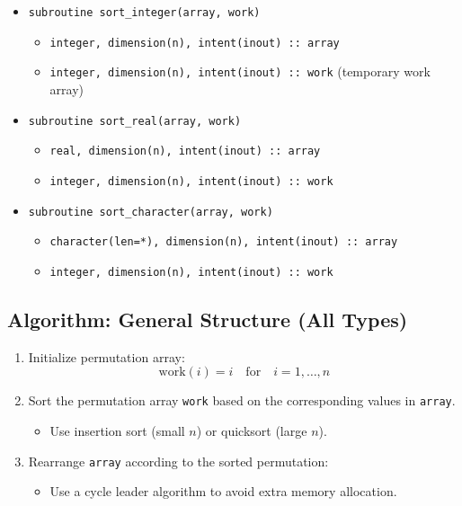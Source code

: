 \documentclass{article}
\begin{document}
\begin{itemize}
    \item \texttt{subroutine sort\_integer(array, work)}
    \begin{itemize}
        \item \texttt{integer, dimension(n), intent(inout) :: array}
        \item \texttt{integer, dimension(n), intent(inout) :: work} \hfill (temporary work array)
    \end{itemize}

    \item \texttt{subroutine sort\_real(array, work)}
    \begin{itemize}
        \item \texttt{real, dimension(n), intent(inout) :: array}
        \item \texttt{integer, dimension(n), intent(inout) :: work}
    \end{itemize}

    \item \texttt{subroutine sort\_character(array, work)}
    \begin{itemize}
        \item \texttt{character(len=*), dimension(n), intent(inout) :: array}
        \item \texttt{integer, dimension(n), intent(inout) :: work}
    \end{itemize}
\end{itemize}

\subsection{Algorithm: General Structure (All Types)}

\begin{enumerate}
    \item Initialize permutation array:
    \[
    \text{work}(i) = i \quad \text{for} \quad i = 1, \ldots, n
    \]
    \item Sort the permutation array \texttt{work} based on the corresponding values in \texttt{array}.
    \begin{itemize}
        \item Use insertion sort (small \( n \)) or quicksort (large \( n \)).
    \end{itemize}
    \item Rearrange \texttt{array} according to the sorted permutation:
    \begin{itemize}
        \item Use a cycle leader algorithm to avoid extra memory allocation.
    \end{itemize}
\end{enumerate}
\end{document}
